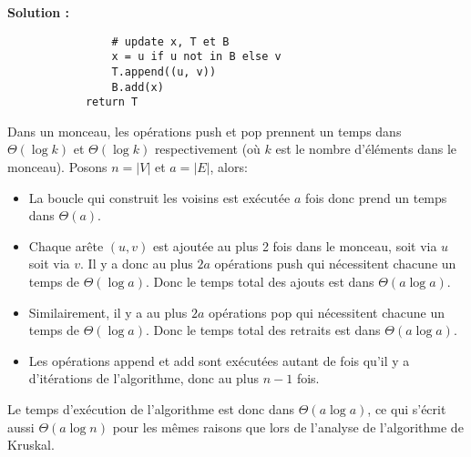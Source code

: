 \documentclass[11pt]{article} %
\newenvironment{solution}[1][\unskip]{%
	\par
	\noindent
	\textbf{Solution #1:}
	\noindent}
{\medskip}
\begin{document}
\begin{solution}
\begin{lstlisting}
				# update x, T et B
				x = u if u not in B else v
				T.append((u, v))
				B.add(x)
			return T
		\end{lstlisting}
		Dans un monceau, les opérations push et pop prennent un temps dans $\Theta(\log k)$ et $\Theta(\log k)$ respectivement (où $k$ est le nombre d'éléments dans le monceau). 
		Posons $n=|V|$ et $a=|E|$, alors:
		\begin{itemize}
			\item {La boucle qui construit les voisins est exécutée $a$ fois donc prend un temps dans $\Theta(a)$.}
			\item {Chaque arête $(u,v)$ est ajoutée au plus 2 fois dans le monceau, soit via $u$ soit via $v$. Il y a donc au plus $2a$ opérations push qui nécessitent chacune un temps de $\Theta(\log a)$. Donc le temps total des ajouts est dans $\Theta(a \log a)$.}
			\item{Similairement, il y a au plus $2a$ opérations pop qui nécessitent chacune un temps de $\Theta(\log a)$. Donc le temps total des retraits est dans $\Theta(a \log a)$.} 
			\item{Les opérations append et add sont exécutées autant de fois qu'il y a d'itérations de l'algorithme, donc au plus $n-1$ fois.}
		\end{itemize}
		Le temps d'exécution de l'algorithme est donc dans $\Theta(a \log a)$, ce qui s'écrit aussi $\Theta(a \log n)$ pour les mêmes raisons que lors de l'analyse de l'algorithme de Kruskal.
	\end{solution}
\end{document}
